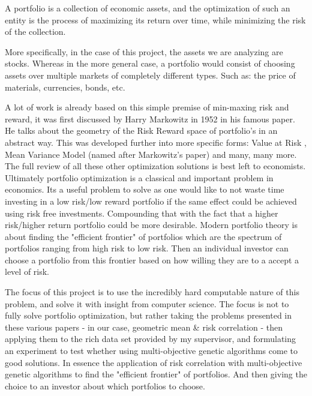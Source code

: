 \documentclass[11pt]{article}
\begin{document}
    A portfolio is a collection of economic assets, and the optimization of such an
    entity is the process of maximizing its return over time, while minimizing the
    risk of the collection.

    More specifically, in the case of this project, the assets we are analyzing are
    stocks. Whereas in the more general case, a portfolio would consist of choosing
    assets over multiple markets of completely different types. Such as: the price of 
    materials, currencies, bonds, etc. 

    A lot of work is already based on this simple premise of min-maxing risk and
    reward, it was first discussed by Harry Markowitz in 1952 \cite{Markowitz}
    in his famous paper. He talks about the geometry of the Risk Reward space
    of portfolio's in an abstract way. This was developed further into more specific
    forms: Value at Risk \cite{ValueAtRisk, Ghaoui}, Mean Variance Model (named
    after Markowitz's paper) \cite{Robert, SidWard} and many, many more.
    The full review of all these other optimization solutions is best left
    to economists. Ultimately portfolio optimization is a classical and important
    problem in economics. Its a useful problem to solve as one would like to
    not waste time investing in a low risk/low reward portfolio if the same
    effect could be achieved using risk free investments. Compounding
    that with the fact that a higher risk/higher return portfolio could
    be more desirable. Modern portfolio theory is about finding the "efficient
    frontier" of portfolios which are the spectrum of portfolios ranging from
    high risk to low risk. Then an individual investor can choose a portfolio
    from this frontier based on how willing they are to a accept a level of
    risk.

    The focus of this project is to use the incredibly hard computable nature
    of this problem, and solve it with insight from computer science. The focus
    is not to fully solve portfolio optimization, but rather taking the problems
    presented in these various papers - in our case, geometric mean \& risk
    correlation - then applying them to the rich data set provided
    by my supervisor, and formulating an experiment to test whether using
    multi-objective genetic algorithms come to good solutions. In essence
    the application of risk correlation with multi-objective genetic algorithms
    to find the "efficient frontier" of portfolios. And then giving the choice
    to an investor about which portfolios to choose.
\end{document}
